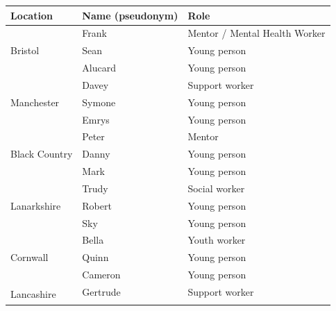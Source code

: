 \begin{table}[hbt!]
\centering
\begin{tabular}{|l|l|l|}
\hline
\textbf{Location}              & \textbf{Name (pseudonym)} & \textbf{Role}                 \\ \hline
\multirow{3}{*}{Bristol}       & Frank                     & Mentor / Mental Health Worker \\ \cline{2-3} 
                               & Sean                      & Young person                  \\ \cline{2-3} 
                               & Alucard                   & Young person                  \\ \hline
\multirow{3}{*}{Manchester}    & Davey                     & Support worker                \\ \cline{2-3} 
                               & Symone                    & Young person                  \\ \cline{2-3} 
                               & Emrys                     & Young person                  \\ \hline
\multirow{3}{*}{Black Country} & Peter                     & Mentor                        \\ \cline{2-3} 
                               & Danny                     & Young person                  \\ \cline{2-3} 
                               & Mark                      & Young person                  \\ \hline
\multirow{3}{*}{Lanarkshire}   & Trudy                     & Social worker                 \\ \cline{2-3} 
                               & Robert                    & Young person                  \\ \cline{2-3} 
                               & Sky                       & Young person                  \\ \hline
\multirow{3}{*}{Cornwall}      & Bella                     & Youth worker                  \\ \cline{2-3} 
                               & Quinn                     & Young person                  \\ \cline{2-3} 
                               & Cameron                   & Young person                  \\ \hline
\multirow{3}{*}{Lancashire}    & Gertrude                  & Support worker                \\ \cline{2-3} 

\end{tabular}
\end{table}
